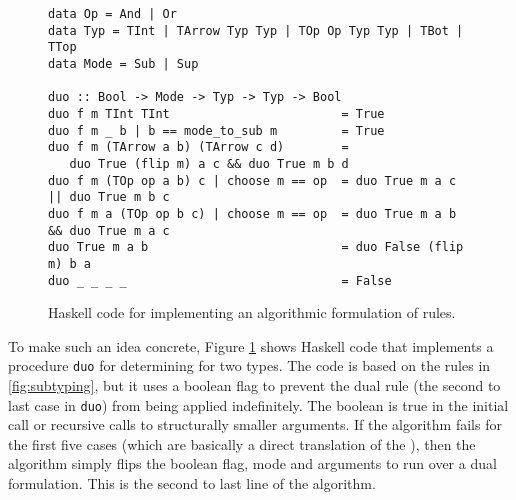 \begin{figure}
\begin{small}
\begin{verbatim}
data Op = And | Or 
data Typ = TInt | TArrow Typ Typ | TOp Op Typ Typ | TBot | TTop 
data Mode = Sub | Sup 

duo :: Bool -> Mode -> Typ -> Typ -> Bool
duo f m TInt TInt                        = True
duo f m _ b | b == mode_to_sub m         = True
duo f m (TArrow a b) (TArrow c d)        = 
   duo True (flip m) a c && duo True m b d
duo f m (TOp op a b) c | choose m == op  = duo True m a c || duo True m b c
duo f m a (TOp op b c) | choose m == op  = duo True m a b && duo True m a c
duo True m a b                           = duo False (flip m) b a
duo _ _ _ _                              = False
\end{verbatim}
\end{small}
\caption{Haskell code for implementing an algorithmic formulation of \nameduo rules.}
\label{fig:codedd}
\end{figure}




\begin{comment}
Instead of having 6 rules for union and
intersection types (like algorithmic \nameduo in \cref{fig:subtyping1}),
we only need 3 rules in declarative \nameduo.  Similarly, only one rule
is needed for the bounds in comparison to two for algorithmic
version.  Furthermore, the code is kept consistent for dual rules.
With the traditional implementation (that requires two cases for dual
rules) we cannot guarantee the consistency of the code.
\end{comment}

To make such an idea concrete, Figure \ref{fig:codedd} shows
Haskell code that implements a procedure \verb|duo| for determining
\nameduo for two types. The code is based on the rules in \cref{fig:subtyping}, but
it uses a boolean flag to prevent the dual rule (the second to
last case in \verb|duo|) from being applied indefinitely.
The boolean is true in the initial call or recursive calls to structurally smaller arguments.
If the algorithm fails for the first five cases
(which are basically a direct translation of the ), then
the algorithm simply
flips the boolean flag, mode and arguments to run over a dual
formulation. This is the second to last line of the
algorithm.


